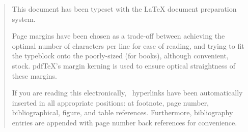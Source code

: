 \vfill
\begin{quotation}
  \noindent This document has been typeset with the \LaTeX{} document
  preparation system.

  Page margins have been chosen as a trade-off between achieving the
  optimal number of characters per line for ease of reading, and trying
  to fit the typeblock onto the poorly-sized (for books), although
  convenient,  stock.
  pdf\/\TeX's margin kerning is used to ensure optical straightness of these
  margins.

  If you are reading this electronically, \PDF\ hyperlinks have
  been automatically inserted in all appropriate positions: at
  footnote, page number, bibliographical, figure, and table
  references. Furthermore, bibliography entries are appended with page
  number back references for convenience.
\end{quotation}
\vfill